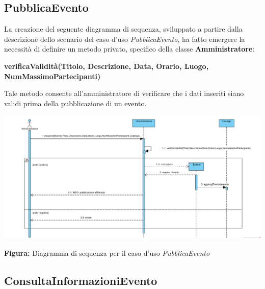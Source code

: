\subsection{PubblicaEvento}

\begin{center}
    La creazione del seguente diagramma di sequenza, sviluppato a partire dalla descrizione dello scenario del caso \noindent d’uso \textit{PubblicaEvento}, ha fatto emergere la necessità di definire un metodo privato, specifico della classe \textbf{Amministratore}:

    \vspace{1ex}
    \textbf{verificaValidità(Titolo, Descrizione, Data, Orario, Luogo, NumMassimoPartecipanti)}
    
    \vspace{2ex}
    Tale metodo consente all’amministratore di verificare che i dati inseriti siano validi prima della pubblicazione di un evento.

    \vspace{3ex}
    \includegraphics[width=\linewidth]{assets/casid'uso/PubblicaEvento.png}
    
    \vspace{1ex}
    \textbf{Figura:} Diagramma di sequenza per il caso d’uso \textit{PubblicaEvento}
\end{center}


\subsection{ConsultaInformazioniEvento}

